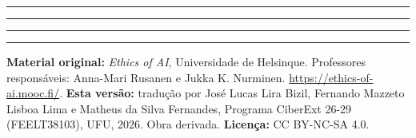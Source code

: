 \documentclass[
  11pt,
]{article}
\newcommand{\faixaEixos}[1][\linewidth]{%
  \noindent
  \textcolor{iaConceitos}{\rule{0.3333#1}{4pt}}%
  \textcolor{iaAplic}{\rule{0.3333#1}{4pt}}%
  \textcolor{iaRiscos}{\rule{0.3333#1}{4pt}}%
  \par}
\newenvironment{licenca}
  {\par\vspace{2em}\faixaEixos\par\vspace{0.8em}
   \begingroup\sffamily\scriptsize\color{iaTintaFraca}}
  {\endgroup\par}
\begin{document}
\begin{center}\rule{0.5\linewidth}{0.5pt}\end{center}

\begin{licenca}

\textbf{Material original:} \emph{Ethics of AI}, Universidade de
Helsinque. Professores responsáveis: Anna-Mari Rusanen e Jukka K.
Nurminen. \url{https://ethics-of-ai.mooc.fi/}. \textbf{Esta versão:}
tradução por José Lucas Lira Bizil, Fernando Mazzeto Lisboa Lima e
Matheus da Silva Fernandes, Programa CiberExt 26-29 (FEELT38103), UFU,
2026. Obra derivada. \textbf{Licença:} CC BY-NC-SA 4.0.

\end{licenca}
\end{document}
